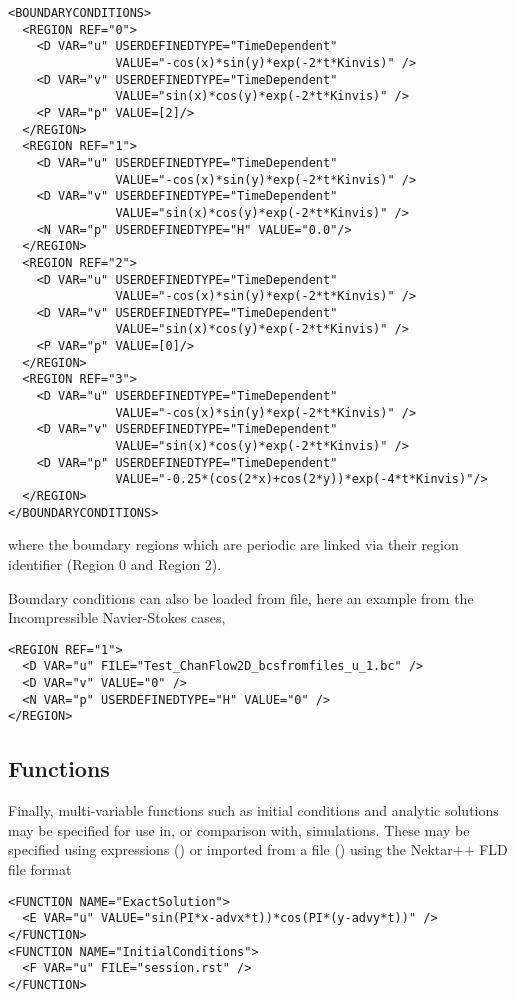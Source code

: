 \begin{lstlisting}[style=XMLStyle]
<BOUNDARYCONDITIONS>
  <REGION REF="0">
    <D VAR="u" USERDEFINEDTYPE="TimeDependent" 
               VALUE="-cos(x)*sin(y)*exp(-2*t*Kinvis)" />
    <D VAR="v" USERDEFINEDTYPE="TimeDependent" 
               VALUE="sin(x)*cos(y)*exp(-2*t*Kinvis)" />
    <P VAR="p" VALUE=[2]/>
  </REGION>
  <REGION REF="1">
    <D VAR="u" USERDEFINEDTYPE="TimeDependent" 
               VALUE="-cos(x)*sin(y)*exp(-2*t*Kinvis)" />
    <D VAR="v" USERDEFINEDTYPE="TimeDependent" 
               VALUE="sin(x)*cos(y)*exp(-2*t*Kinvis)" />
    <N VAR="p" USERDEFINEDTYPE="H" VALUE="0.0"/>
  </REGION>
  <REGION REF="2">
    <D VAR="u" USERDEFINEDTYPE="TimeDependent" 
               VALUE="-cos(x)*sin(y)*exp(-2*t*Kinvis)" />
    <D VAR="v" USERDEFINEDTYPE="TimeDependent" 
               VALUE="sin(x)*cos(y)*exp(-2*t*Kinvis)" />
    <P VAR="p" VALUE=[0]/>
  </REGION>
  <REGION REF="3">
    <D VAR="u" USERDEFINEDTYPE="TimeDependent" 
               VALUE="-cos(x)*sin(y)*exp(-2*t*Kinvis)" />
    <D VAR="v" USERDEFINEDTYPE="TimeDependent" 
               VALUE="sin(x)*cos(y)*exp(-2*t*Kinvis)" />
    <D VAR="p" USERDEFINEDTYPE="TimeDependent" 
               VALUE="-0.25*(cos(2*x)+cos(2*y))*exp(-4*t*Kinvis)"/>
  </REGION>
</BOUNDARYCONDITIONS>
\end{lstlisting}

where the boundary regions which are periodic are linked via their region
identifier (Region 0 and Region 2).

Boundary conditions can also be loaded from file, here an example from the
Incompressible Navier-Stokes cases,

\begin{lstlisting}[style=XMLStyle]
<REGION REF="1">
  <D VAR="u" FILE="Test_ChanFlow2D_bcsfromfiles_u_1.bc" />
  <D VAR="v" VALUE="0" />
  <N VAR="p" USERDEFINEDTYPE="H" VALUE="0" />
</REGION>
\end{lstlisting}

\subsection{Functions}

Finally, multi-variable functions such as initial conditions and analytic
solutions may be specified for use in, or comparison with, simulations. These
may be specified using expressions () or imported from a file
() using the Nektar++ FLD file format

\begin{lstlisting}[style=XMLStyle]
<FUNCTION NAME="ExactSolution">
  <E VAR="u" VALUE="sin(PI*x-advx*t))*cos(PI*(y-advy*t))" />
</FUNCTION>
<FUNCTION NAME="InitialConditions">
  <F VAR="u" FILE="session.rst" />
</FUNCTION>
\end{lstlisting}

